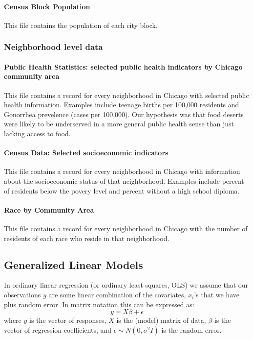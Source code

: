 \documentclass{report}
\begin{document}
\paragraph{ Census Block Population  }
This file contains the population of each city block. 

\subsubsection*{Neighborhood level data}

\paragraph{ Public Health Statistics: selected public health indicators by Chicago community area}
This file contains a record for every neighborhood in Chicago with selected public health information. Examples include teenage births per 100,000 residents and Gonorrhea prevelence (cases per 100,000). Our hypothesis was that food deserts were likely to be underserved in a more general public health sense than just lacking access to food. 

\paragraph{ Census Data: Selected socioeconomic indicators    }
This file contains a record for every neighborhood in Chicago with information about the socioeconomic status of that neighborhood. Examples include percent of residents below the povery level and percent without a high school diploma. 

\paragraph{ Race by Community Area }
This file contains a record for every neighborhood in Chicago with the number of residents of each race who reside in that neighborhood. \\


\subsection*{Generalized Linear Models}

In ordinary linear regression (or ordinary least squares, OLS) we assume that our observations $y$ are some linear combination of the covariates, $x_i$'s that we have plus random error. In matrix notation this can be expressed as: $$y = X\beta + \epsilon$$ where $y$ is the vector of responses, $X$ is the (model) matrix of data, $\beta$ is the vector of regression coefficients, and $\epsilon \sim N(0, \sigma^2 I)$ is the random error.
\end{document}
